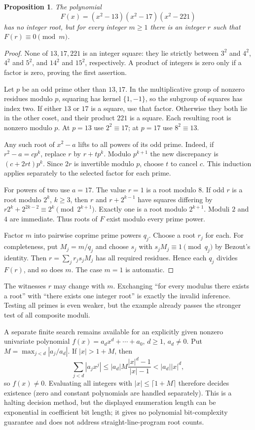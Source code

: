 \documentclass[11pt]{article}
\newtheorem{proposition}{Proposition}
\begin{document}
\begin{proposition}
The polynomial
\[
 F(x)=(x^2-13)(x^2-17)(x^2-221)
\]
has no integer root, but for every integer $m\ge1$ there is an integer $r$ such that $F(r)\equiv0\pmod m$.
\end{proposition}
\begin{proof}
None of $13,17,221$ is an integer square: they lie strictly between $3^2$ and $4^2$, $4^2$ and $5^2$, and $14^2$ and $15^2$, respectively. A product of integers is zero only if a factor is zero, proving the first assertion.

Let $p$ be an odd prime other than $13,17$. In the multiplicative group of nonzero residues modulo $p$, squaring has kernel $\{1,-1\}$, so the subgroup of squares has index two. If either $13$ or $17$ is a square, use that factor. Otherwise they both lie in the other coset, and their product $221$ is a square. Each resulting root is nonzero modulo $p$. At $p=13$ use $2^2\equiv17$; at $p=17$ use $8^2\equiv13$.

Any such root of $x^2-a$ lifts to all powers of its odd prime. Indeed, if $r^2-a=cp^k$, replace $r$ by $r+tp^k$. Modulo $p^{k+1}$ the new discrepancy is $(c+2rt)p^k$. Since $2r$ is invertible modulo $p$, choose $t$ to cancel $c$. This induction applies separately to the selected factor for each prime.

For powers of two use $a=17$. The value $r=1$ is a root modulo $8$. If odd $r$ is a root modulo $2^k$, $k\ge3$, then $r$ and $r+2^{k-1}$ have squares differing by $r2^k+2^{2k-2}\equiv2^k\pmod{2^{k+1}}$. Exactly one is a root modulo $2^{k+1}$. Moduli $2$ and $4$ are immediate. Thus roots of $F$ exist modulo every prime power.

Factor $m$ into pairwise coprime prime powers $q_j$. Choose a root $r_j$ for each. For completeness, put $M_j=m/q_j$ and choose $s_j$ with $s_jM_j\equiv1\pmod{q_j}$ by Bezout's identity. Then $r=\sum_jr_js_jM_j$ has all required residues. Hence each $q_j$ divides $F(r)$, and so does $m$. The case $m=1$ is automatic.
\end{proof}

The witnesses $r$ may change with $m$. Exchanging ``for every modulus there exists a root'' with ``there exists one integer root'' is exactly the invalid inference. Testing all primes is even weaker, but the example already passes the stronger test of all composite moduli.

A separate finite search remains available for an explicitly given nonzero univariate polynomial $f(x)=a_dx^d+\cdots+a_0$, $d\ge1$, $a_d\ne0$. Put $M=\max_{j<d}|a_j/a_d|$. If $|x|>1+M$, then
\[
 \sum_{j<d}|a_jx^j|\le |a_d|M\frac{|x|^d-1}{|x|-1}<|a_d||x|^d,
\]
so $f(x)\ne0$. Evaluating all integers with $|x|\le\lceil1+M\rceil$ therefore decides existence (zero and constant polynomials are handled separately). This is a halting decision method, but the displayed enumeration length can be exponential in coefficient bit length; it gives no polynomial bit-complexity guarantee and does not address straight-line-program root counts.
\end{document}
